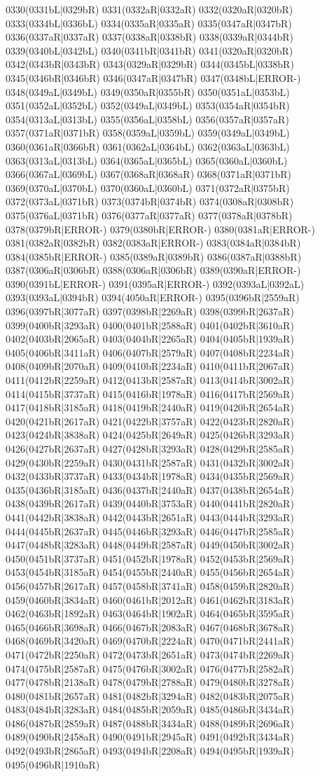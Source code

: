 0330(0331bL|0329bR) 0331(0332aR|0332aR) 0332(0320aR|0320bR) 0333(0334bL|0336bL) 0334(0335aR|0335aR) 0335(0347aR|0347bR) 0336(0337aR|0337aR) 0337(0338aR|0338bR) 0338(0339aR|0344bR) 0339(0340bL|0342bL) 0340(0341bR|0341bR) 0341(0320aR|0320bR) 0342(0343bR|0343bR) 0343(0329aR|0329bR) 0344(0345bL|0338bR) 0345(0346bR|0346bR) 0346(0347aR|0347bR) 0347(0348bL|ERROR-) 0348(0349aL|0349bL) 0349(0350aR|0355bR) 0350(0351aL|0353bL) 0351(0352aL|0352bL) 0352(0349aL|0349bL) 0353(0354aR|0354bR) 0354(0313aL|0313bL) 0355(0356aL|0358bL) 0356(0357aR|0357aR) 0357(0371aR|0371bR) 0358(0359aL|0359bL) 0359(0349aL|0349bL) 0360(0361aR|0366bR) 0361(0362aL|0364bL) 0362(0363aL|0363bL) 0363(0313aL|0313bL) 0364(0365aL|0365bL) 0365(0360aL|0360bL) 0366(0367aL|0369bL) 0367(0368aR|0368aR) 0368(0371aR|0371bR) 0369(0370aL|0370bL) 0370(0360aL|0360bL) 0371(0372aR|0375bR) 0372(0373aL|0371bR) 0373(0374bR|0374bR) 0374(0308aR|0308bR) 0375(0376aL|0371bR) 0376(0377aR|0377aR) 0377(0378aR|0378bR) 0378(0379bR|ERROR-) 0379(0380bR|ERROR-) 0380(0381aR|ERROR-) 0381(0382aR|0382bR) 0382(0383aR|ERROR-) 0383(0384aR|0384bR) 0384(0385bR|ERROR-) 0385(0389aR|0389bR) 0386(0387aR|0388bR) 0387(0306aR|0306bR) 0388(0306aR|0306bR) 0389(0390aR|ERROR-) 0390(0391bL|ERROR-) 0391(0395aR|ERROR-) 0392(0393aL|0392aL) 0393(0393aL|0394bR) 0394(4050aR|ERROR-) 0395(0396bR|2559aR) 0396(0397bR|3077aR) 0397(0398bR|2269aR) 0398(0399bR|2637aR) 0399(0400bR|3293aR) 0400(0401bR|2588aR) 0401(0402bR|3610aR) 0402(0403bR|2065aR) 0403(0404bR|2265aR) 0404(0405bR|1939aR) 0405(0406bR|3411aR) 0406(0407bR|2579aR) 0407(0408bR|2234aR) 0408(0409bR|2070aR) 0409(0410bR|2234aR) 0410(0411bR|2067aR) 0411(0412bR|2259aR) 0412(0413bR|2587aR) 0413(0414bR|3002aR) 0414(0415bR|3737aR) 0415(0416bR|1978aR) 0416(0417bR|2569aR) 0417(0418bR|3185aR) 0418(0419bR|2440aR) 0419(0420bR|2654aR) 0420(0421bR|2617aR) 0421(0422bR|3757aR) 0422(0423bR|2820aR) 0423(0424bR|3838aR) 0424(0425bR|2649aR) 0425(0426bR|3293aR) 0426(0427bR|2637aR) 0427(0428bR|3293aR) 0428(0429bR|2585aR) 0429(0430bR|2259aR) 0430(0431bR|2587aR) 0431(0432bR|3002aR) 0432(0433bR|3737aR) 0433(0434bR|1978aR) 0434(0435bR|2569aR) 0435(0436bR|3185aR) 0436(0437bR|2440aR) 0437(0438bR|2654aR) 0438(0439bR|2617aR) 0439(0440bR|3753aR) 0440(0441bR|2820aR) 0441(0442bR|3838aR) 0442(0443bR|2651aR) 0443(0444bR|3293aR) 0444(0445bR|2637aR) 0445(0446bR|3293aR) 0446(0447bR|2585aR) 0447(0448bR|3283aR) 0448(0449bR|2587aR) 0449(0450bR|3002aR) 0450(0451bR|3737aR) 0451(0452bR|1978aR) 0452(0453bR|2569aR) 0453(0454bR|3185aR) 0454(0455bR|2440aR) 0455(0456bR|2654aR) 0456(0457bR|2617aR) 0457(0458bR|3741aR) 0458(0459bR|2820aR) 0459(0460bR|3834aR) 0460(0461bR|2012aR) 0461(0462bR|3183aR) 0462(0463bR|1892aR) 0463(0464bR|1902aR) 0464(0465bR|3595aR) 0465(0466bR|3698aR) 0466(0467bR|2083aR) 0467(0468bR|3678aR) 0468(0469bR|3420aR) 0469(0470bR|2224aR) 0470(0471bR|2441aR) 0471(0472bR|2250aR) 0472(0473bR|2651aR) 0473(0474bR|2269aR) 0474(0475bR|2587aR) 0475(0476bR|3002aR) 0476(0477bR|2582aR) 0477(0478bR|2138aR) 0478(0479bR|2788aR) 0479(0480bR|3278aR) 0480(0481bR|2657aR) 0481(0482bR|3294aR) 0482(0483bR|2075aR) 0483(0484bR|3283aR) 0484(0485bR|2059aR) 0485(0486bR|3434aR) 0486(0487bR|2859aR) 0487(0488bR|3434aR) 0488(0489bR|2696aR) 0489(0490bR|2458aR) 0490(0491bR|2945aR) 0491(0492bR|3434aR) 0492(0493bR|2865aR) 0493(0494bR|2208aR) 0494(0495bR|1939aR) 0495(0496bR|1910aR) 